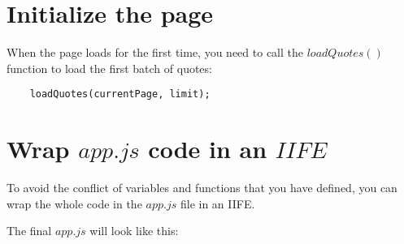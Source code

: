 \documentclass[11pt]{article}
\begin{document}
\section*{Initialize the page}

When the page loads for the first time, you need to call the
$loadQuotes()$ function to load the first batch of quotes:

\begin{lstlisting}
    loadQuotes(currentPage, limit);
\end{lstlisting}

\section*{Wrap $app.js$ code in an $IIFE$}

To avoid the conflict of variables and functions that you have defined,
you can wrap the whole code in the $app.js$ file in an IIFE.

The final $app.js$ will look like this:
\end{document}
